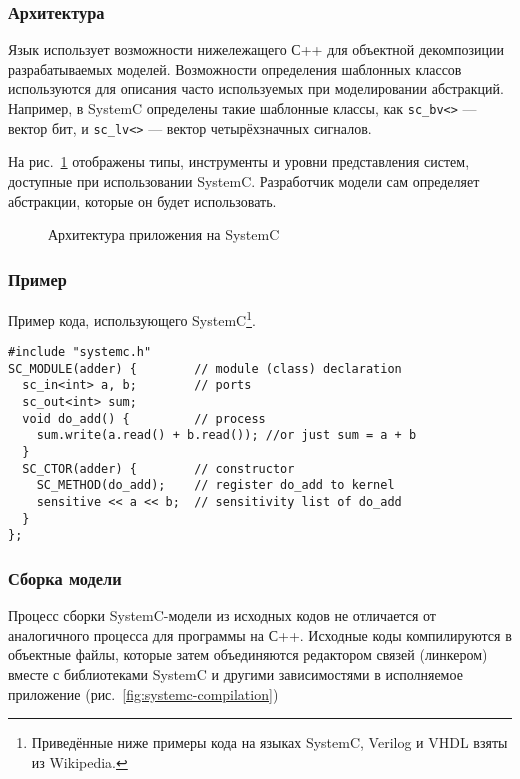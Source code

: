 \subsubsection{Архитектура}

Язык использует возможности нижележащего С++ для объектной декомпозиции разрабатываемых моделей. Возможности определения шаблонных классов используются для описания часто используемых при моделировании абстракций. Например, в SystemC определены такие шаблонные классы, как \texttt{sc_bv<>} --- вектор бит, и \texttt{sc_lv<>} --- вектор четырёхзначных сигналов.

На рис.~\ref{fig:systemc-arch} отображены типы, инструменты и уровни представления систем, доступные при использовании SystemC. Разработчик модели сам определяет абстракции, которые он будет использовать.

\begin{figure}[htb]
    \centering
    \caption[Архитектура приложения на SystemC]{Архитектура приложения на SystemC}
    \label{fig:systemc-arch}
\end{figure}

\subsubsection{Пример}

Пример кода, использующего SystemC\footnote{Приведённые ниже примеры кода на языках SystemC, Verilog  и VHDL взяты из Wikipedia.}.

\begin{lstlisting}
#include "systemc.h"
SC_MODULE(adder) {        // module (class) declaration
  sc_in<int> a, b;        // ports
  sc_out<int> sum;
  void do_add() {         // process
    sum.write(a.read() + b.read()); //or just sum = a + b
  }
  SC_CTOR(adder) {        // constructor
    SC_METHOD(do_add);    // register do_add to kernel
    sensitive << a << b;  // sensitivity list of do_add
  }
};
\end{lstlisting} 

\subsubsection{Сборка модели}

Процесс сборки SystemC-модели из исходных кодов не отличается от аналогичного процесса для программы на С++. Исходные коды компилируются в объектные файлы, которые затем объединяются редактором связей (линкером) вместе с библиотеками SystemC и другими зависимостями в исполняемое приложение (рис.~\ref{fig:systemc-compilation})

